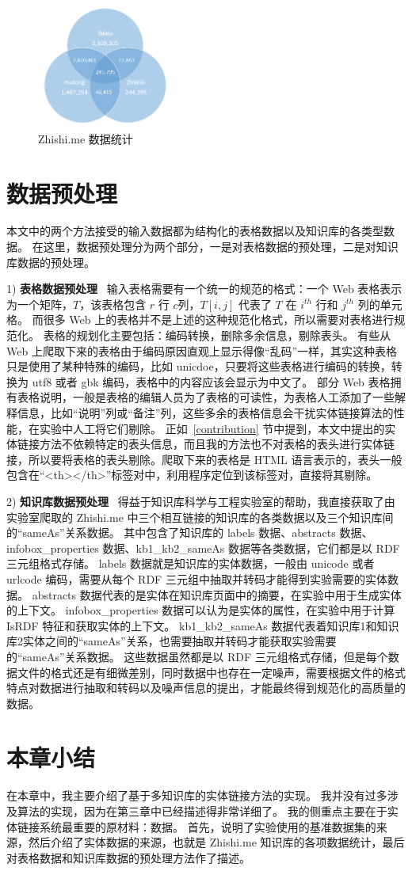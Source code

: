 \begin{figure}[htbp]
\centering
\includegraphics[width=0.4\textwidth]{img/zhishime_data}
\caption{Zhishi.me 数据统计}
\label{zhishime_data}
\end{figure}


\section{数据预处理}
本文中的两个方法接受的输入数据都为结构化的表格数据以及知识库的各类型数据。
在这里，数据预处理分为两个部分，一是对表格数据的预处理，二是对知识库数据的预处理。

1) \textbf{表格数据预处理} \ 
输入表格需要有一个统一的规范的格式：一个 Web 表格表示为一个矩阵，$T$，该表格包含 $r$ 行 $c$列，$T[i,j]$ 代表了 $T$ 在 $i^{th}$ 行和 $j^{th}$ 列的单元格。
而很多 Web 上的表格并不是上述的这种规范化格式，所以需要对表格进行规范化。
表格的规划化主要包括：编码转换，删除多余信息，剔除表头。
有些从 Web 上爬取下来的表格由于编码原因直观上显示得像``乱码''一样，其实这种表格只是使用了某种特殊的编码，比如 unicdoe，只要将这些表格进行编码的转换，转换为 utf8 或者 gbk 编码，表格中的内容应该会显示为中文了。
部分 Web 表格拥有表格说明，一般是表格的编辑人员为了表格的可读性，为表格人工添加了一些解释信息，比如``说明''列或``备注''列，这些多余的表格信息会干扰实体链接算法的性能，在实验中人工将它们剔除。
正如~\ref{contribution} 节中提到，本文中提出的实体链接方法不依赖特定的表头信息，而且我的方法也不对表格的表头进行实体链接，所以要将表格的表头剔除。爬取下来的表格是 HTML 语言表示的，表头一般包含在``<th></th>''标签对中，利用程序定位到该标签对，直接将其剔除。

2) \textbf{知识库数据预处理} \ 
得益于知识库科学与工程实验室的帮助，我直接获取了由实验室爬取的 Zhishi.me 中三个相互链接的知识库的各类数据以及三个知识库间的``sameAs''关系数据。
其中包含了知识库的 labels 数据、abstracts 数据、infobox\_properties 数据、kb1\_kb2\_sameAs 数据等各类数据，它们都是以 RDF 三元组格式存储。
labels 数据就是知识库的实体数据，一般由 unicode 或者 urlcode 编码，需要从每个 RDF 三元组中抽取并转码才能得到实验需要的实体数据。
abstracts 数据代表的是实体在知识库页面中的摘要，在实验中用于生成实体的上下文。
infobox\_properties 数据可以认为是实体的属性，在实验中用于计算 IsRDF 特征和获取实体的上下文。
kb1\_kb2\_sameAs 数据代表着知识库1和知识库2实体之间的``sameAs''关系，也需要抽取并转码才能获取实验需要的``sameAs''关系数据。
这些数据虽然都是以 RDF 三元组格式存储，但是每个数据文件的格式还是有细微差别，同时数据中也存在一定噪声，需要根据文件的格式特点对数据进行抽取和转码以及噪声信息的提出，才能最终得到规范化的高质量的数据。


\section{本章小结}
在本章中，我主要介绍了基于多知识库的实体链接方法的实现。
我并没有过多涉及算法的实现，因为在第三章中已经描述得非常详细了。
我的侧重点主要在于实体链接系统最重要的原材料：数据。
首先，说明了实验使用的基准数据集的来源，然后介绍了实体数据的来源，也就是 Zhishi.me 知识库的各项数据统计，最后对表格数据和知识库数据的预处理方法作了描述。